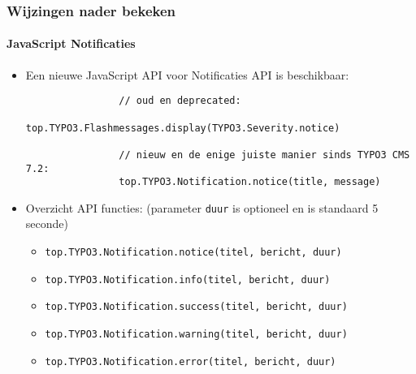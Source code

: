 \begin{frame}[fragile]
	\frametitle{Wijzingen nader bekeken}
	\framesubtitle{JavaScript Notificaties}

	\begin{itemize}

		\item Een nieuwe JavaScript API voor Notificaties API is beschikbaar:
			\begin{lstlisting}
				// oud en deprecated:
				top.TYPO3.Flashmessages.display(TYPO3.Severity.notice)

				// nieuw en de enige juiste manier sinds TYPO3 CMS 7.2:
				top.TYPO3.Notification.notice(title, message)
    		\end{lstlisting}

		\item Overzicht API functies:\newline
			\small(parameter \texttt{duur} is optioneel en is standaard 5 seconde)\normalsize
			\begin{itemize}
				\item \normalsize\smaller\texttt{top.TYPO3.Notification.notice(titel, bericht, duur)}\normalsize
				\item \smaller\texttt{top.TYPO3.Notification.info(titel, bericht, duur)}\normalsize
				\item \smaller\texttt{top.TYPO3.Notification.success(titel, bericht, duur)}\normalsize
				\item \smaller\texttt{top.TYPO3.Notification.warning(titel, bericht, duur)}\normalsize
				\item \smaller\texttt{top.TYPO3.Notification.error(titel, bericht, duur)}\normalsize
			\end{itemize}

	\end{itemize}

\end{frame}

